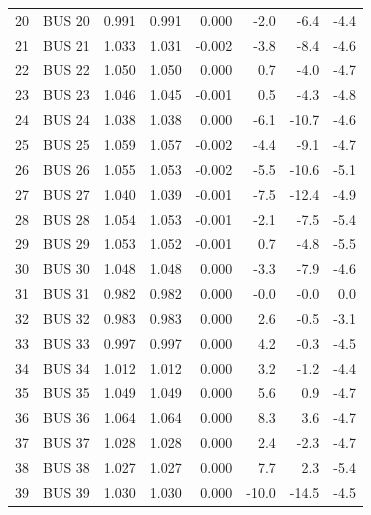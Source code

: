 \documentclass[12pt]{classe_uftex/uftex}
\begin{document}
\begin{longtable}{rlrrrrrr}
20 & BUS 20 & 0.991 & 0.991 & 0.000 & -2.0 & -6.4 & -4.4 \\
21 & BUS 21 & 1.033 & 1.031 & -0.002 & -3.8 & -8.4 & -4.6 \\
22 & BUS 22 & 1.050 & 1.050 & 0.000 & 0.7 & -4.0 & -4.7 \\
23 & BUS 23 & 1.046 & 1.045 & -0.001 & 0.5 & -4.3 & -4.8 \\
24 & BUS 24 & 1.038 & 1.038 & 0.000 & -6.1 & -10.7 & -4.6 \\
25 & BUS 25 & 1.059 & 1.057 & -0.002 & -4.4 & -9.1 & -4.7 \\
26 & BUS 26 & 1.055 & 1.053 & -0.002 & -5.5 & -10.6 & -5.1 \\
27 & BUS 27 & 1.040 & 1.039 & -0.001 & -7.5 & -12.4 & -4.9 \\
28 & BUS 28 & 1.054 & 1.053 & -0.001 & -2.1 & -7.5 & -5.4 \\
29 & BUS 29 & 1.053 & 1.052 & -0.001 & 0.7 & -4.8 & -5.5 \\
30 & BUS 30 & 1.048 & 1.048 & 0.000 & -3.3 & -7.9 & -4.6 \\
31 & BUS 31 & 0.982 & 0.982 & 0.000 & -0.0 & -0.0 & 0.0 \\
32 & BUS 32 & 0.983 & 0.983 & 0.000 & 2.6 & -0.5 & -3.1 \\
33 & BUS 33 & 0.997 & 0.997 & 0.000 & 4.2 & -0.3 & -4.5 \\
34 & BUS 34 & 1.012 & 1.012 & 0.000 & 3.2 & -1.2 & -4.4 \\
35 & BUS 35 & 1.049 & 1.049 & 0.000 & 5.6 & 0.9 & -4.7 \\
36 & BUS 36 & 1.064 & 1.064 & 0.000 & 8.3 & 3.6 & -4.7 \\
37 & BUS 37 & 1.028 & 1.028 & 0.000 & 2.4 & -2.3 & -4.7 \\
38 & BUS 38 & 1.027 & 1.027 & 0.000 & 7.7 & 2.3 & -5.4 \\
39 & BUS 39 & 1.030 & 1.030 & 0.000 & -10.0 & -14.5 & -4.5 \\
\end{longtable}
\normalsize
\end{document}
